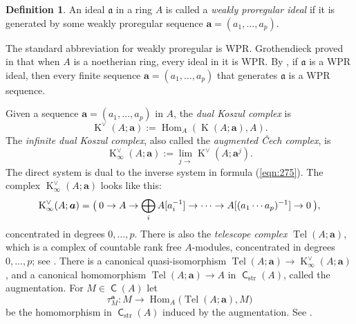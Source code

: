 \documentclass[10pt]{amsart}
\theoremstyle{definition}
\newtheorem{dfn}[equation]{Definition}
\numberwithin{equation}{section}
\newcommand{\opn}{\operatorname}
\newcommand{\cat}[1]{\operatorname{\mathsf{#1}}}
\newcommand{\mfrak}[1]{\mathfrak{#1}}
\newcommand{\mrm}[1]{\mathrm{#1}}
\renewcommand{\a}{\mfrak{a}}
\newcommand{\ba}{\bsym{a}}
\newcommand{\bsym}[1]{\boldsymbol{#1}}
\newcommand{\msp}[1]{\mspace{#1 mu}}
\begin{document}
\begin{dfn} \label{dfn:256}
An ideal $\a$ in a ring $A$ is called a {\em weakly proregular ideal}
if it is generated by some weakly proregular sequence
$\ba = (a_1, \ldots, a_p)$.
\end{dfn}

The standard abbreviation for weakly proregular is WPR.
Grothendieck proved in \cite{LC} that when $A$ is a noetherian ring, every
ideal in it is WPR. By \cite[Corollary 6.3]{PSY1}, if $\a$ is a WPR ideal,
then every finite sequence $\ba = (a_1, \ldots, a_p)$ that generates $\a$ is a
WPR sequence.

Given a sequence $\ba = (a_1, \ldots, a_p)$ in $A$,
the {\em dual Koszul complex} is
\begin{equation} \label{eqn:330}
\opn{K}^{\vee}(A; \ba) := \opn{Hom}_A(\opn{K}(A; \ba), A) .
\end{equation}
The {\em infinite  dual Koszul complex}, also called the {\em augmented
\v{C}ech complex}, is
\begin{equation} \label{eqn:331}
\opn{K}^{\vee}_{\infty}(A; \ba) :=
\lim_{j \to} \opn{K}^{\vee}_{}(A; \ba^j) .
\end{equation}
The direct system is dual to the inverse system in formula
(\ref{eqn:275}).
The complex $\opn{K}^{\vee}_{\infty}(A; \ba)$ looks like this:
\begin{equation} \label{eqn:332}
\opn{K}^{\vee}_{\infty}(A; \ba) =
\bigl( \msp{4} 0 \to A \to \bigoplus_i A[a_i^{-1}] \to \cdots \to
A[(a_1 \cdots a_p)^{-1}] \to 0 \msp{4} \bigr) ,
\end{equation}
concentrated in degrees $0, \ldots, p$.
There is also the {\em telescope complex}
$\opn{Tel}(A; \ba)$, which is a complex of countable rank free $A$-modules,
concentrated in degrees $0, \ldots, p$; see \cite[Section 5]{PSY1}.
There is a canonical quasi-isomorphism
$\opn{Tel}(A; \ba) \to \opn{K}_{\infty}^{\vee}(A; \ba)$,
and a canonical homomorphism
$\opn{Tel}(A; \ba) \to A$ in $\cat{C}_{\mrm{str}}(A)$, called the augmentation.
For $M \in \cat{C}(A)$ let
\begin{equation} \label{eqn:337}
\tau^{\ba}_{M} : M \to \opn{Hom}_{A} \bigl( \opn{Tel}(A; \ba), M \bigr)
\end{equation}
be the homomorphism in $\cat{C}_{\mrm{str}}(A)$ induced by the augmentation.
See \cite[Equation (5.19)]{PSY1}.
\end{document}
